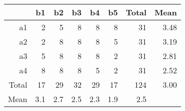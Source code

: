  \begin{center}
 \begin{tabular}{r|rrrrr|rr}
  \hline
     & b1 & b2 & b3 & b4 & b5 & Total & Mean \\ 
  \hline
  a1 & 2 & 5 & 8 & 8 & 8 & 31 & 3.48 \\ 
  a2 & 2 & 8 & 8 & 8 & 5 & 31 & 3.19 \\ 
  a3 & 5 & 8 & 8 & 8 & 2 & 31 & 2.81 \\ 
  a4 & 8 & 8 & 8 & 5 & 2 & 31 & 2.52 \\ 
  \hline
  Total & 17 & 29 & 32 & 29 & 17 & 124 & 3.00 \\ 
  Mean & 3.1 & 2.7 & 2.5 & 2.3 & 1.9 & 2.5\\
  \hline
 \end{tabular}
 \end{center}
